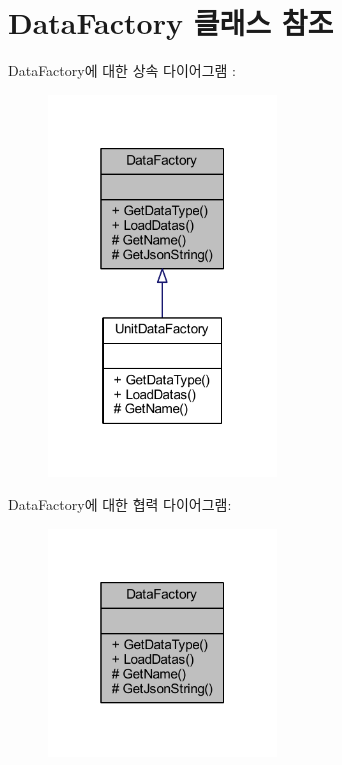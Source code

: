 \hypertarget{class_data_factory}{}\section{Data\+Factory 클래스 참조}
\label{class_data_factory}


Data\+Factory에 대한 상속 다이어그램 \+: 
\nopagebreak
\begin{figure}[H]
\begin{center}
\leavevmode
\includegraphics[width=172pt]{class_data_factory__inherit__graph}
\end{center}
\end{figure}


Data\+Factory에 대한 협력 다이어그램\+:
\nopagebreak
\begin{figure}[H]
\begin{center}
\leavevmode
\includegraphics[width=172pt]{class_data_factory__coll__graph}
\end{center}
\end{figure}
